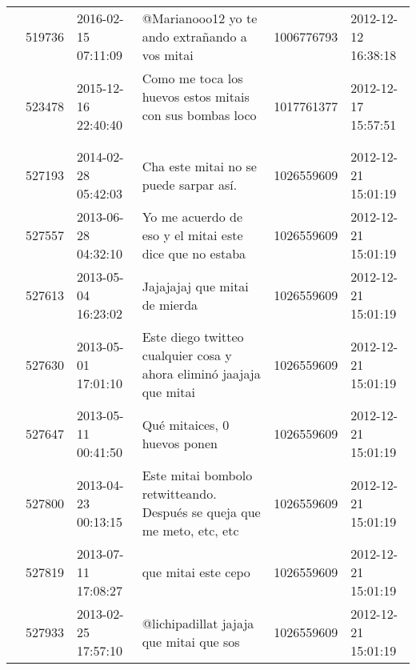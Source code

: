 \begin{tabular}{llllrl}
           & 519736  & 2016-02-15 07:11:09 &                                                                                               @Marianooo12 yo te ando extrañando a vos mitai &  1006776793 & 2012-12-12 16:38:18 \\
           & 523478  & 2015-12-16 22:40:40 &                                                                                   Como me toca los huevos estos mitais con sus bombas loco 😤 &  1017761377 & 2012-12-17 15:57:51 \\
           & 527193  & 2014-02-28 05:42:03 &                                                                                                       Cha este mitai no se puede sarpar así. &  1026559609 & 2012-12-21 15:01:19 \\
           & 527557  & 2013-06-28 04:32:10 &                                                                                      Yo me acuerdo de eso y el mitai este dice que no estaba &  1026559609 & 2012-12-21 15:01:19 \\
           & 527613  & 2013-05-04 16:23:02 &                                                                                                                Jajajajaj que mitai de mierda &  1026559609 & 2012-12-21 15:01:19 \\
           & 527630  & 2013-05-01 17:01:10 &                                                                          Este diego twitteo cualquier cosa y ahora eliminó jaajaja que mitai &  1026559609 & 2012-12-21 15:01:19 \\
           & 527647  & 2013-05-11 00:41:50 &                                                                                                                 Qué mitaices, 0 huevos ponen &  1026559609 & 2012-12-21 15:01:19 \\
           & 527800  & 2013-04-23 00:13:15 &                                                                      Este mitai bombolo retwitteando. Después se queja que me meto, etc, etc &  1026559609 & 2012-12-21 15:01:19 \\
           & 527819  & 2013-07-11 17:08:27 &                                                                                                                          que mitai este cepo &  1026559609 & 2012-12-21 15:01:19 \\
           & 527933  & 2013-02-25 17:57:10 &                                                                                                      @lichipadillat jajaja que mitai que sos &  1026559609 & 2012-12-21 15:01:19 \\

\end{tabular}
